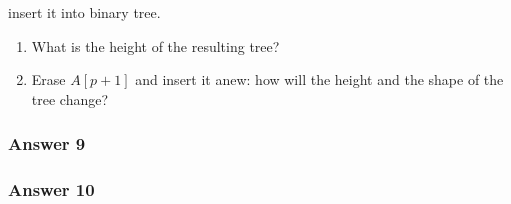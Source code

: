 \documentclass[11pt]{article}
\begin{document}
insert it into binary tree.
\begin{enumerate}
\item What is the height of the resulting tree?
\item Erase $A[p+1]$ and insert it anew: how will the height and the shape of
the tree change?
\end{enumerate}

\subsubsection{Answer 9}
\label{sec-1-4-1}

\subsubsection{Answer 10}
\label{sec-1-4-2}
\end{document}
